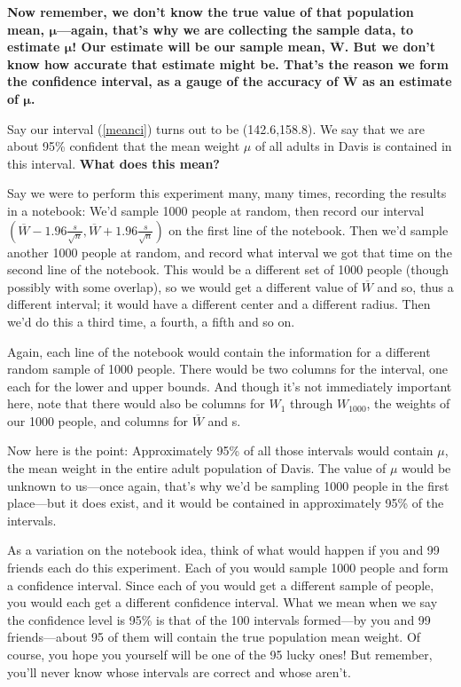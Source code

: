 {\bf Now remember, we don't know the true value of that population mean,
$\mathbf{\mu}$---again, that's why we are collecting the sample
data, to estimate $\mathbf{\mu}$!  Our estimate will be our sample mean,
$\mathbf{\overline{W}}$.  But we don't know how accurate that estimate
might be.  That's the reason we form the confidence interval, as a gauge
of the accuracy of $\mathbf{\overline{W}}$ as an estimate of
$\mathbf{\mu}$.}


Say our interval (\ref{meanci}) turns out to be (142.6,158.8).  We say
that we are about 95\% confident that the mean weight $\mu$ of all
adults in Davis is contained in this interval.  {\bf What does this
mean?}  

Say we were to perform this experiment many, many times, recording the
results in a notebook:  We'd sample 1000 people at random, then record
our interval $(\overline{W} - 1.96 \frac{s}{\sqrt{n}}, \overline{W} + 1.96
\frac{s}{\sqrt{n}})$ on the first line of the notebook.  Then we'd
sample another 1000 people at random, and record what interval we got
that time on the second line of the notebook.  This would be a different
set of 1000 people (though possibly with some overlap), so we would get
a different value of $\overline{W}$ and so, thus a different interval; it
would have a different center and a different radius.  Then we'd do this
a third time, a fourth, a fifth and so on.  

Again, each line of the notebook would contain the information for a
different random sample of 1000 people.  There would be two columns for
the interval, one each for the lower and upper bounds.  And though it's
not immediately important here, note that there would also be columns
for $W_1$ through $W_{1000}$, the weights of our 1000 people, and
columns for $\overline{W}$ and s.

Now here is the point:  Approximately 95\% of all those intervals would
contain $\mu$, the mean weight in the entire adult population of Davis.
The value of $\mu$ would be unknown to us---once again, that's why we'd
be sampling 1000 people in the first place---but it does exist, and it
would be contained in approximately 95\% of the intervals.

As a variation on the notebook idea, think of what would happen if you
and 99 friends each do this experiment.  Each of you would sample 1000
people and form a confidence interval.  Since each of you would get a
different sample of people, you would each get a different confidence
interval.  What we mean when we say the confidence level is 95\% is that
of the 100 intervals formed---by you and 99 friends---about 95 of them
will contain the true population mean weight.  Of course, you hope you
yourself will be one of the 95 lucky ones!  But remember, you'll never
know whose intervals are correct and whose aren't.

